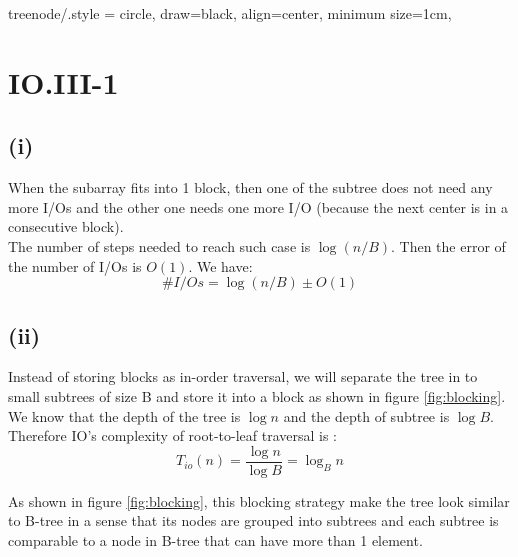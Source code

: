 
\tikzset
{
    treenode/.style = {circle, draw=black, align=center, minimum size=1cm},
}

\section*{IO.III-1}

\subsection*{(i)}
When the subarray fits into 1 block, then one of the subtree does not need any more I/Os and the other one needs one more I/O (because the next center is in a consecutive block).\\ 

The number of steps needed to reach such case is $\log(n/B)$. Then the error of the number of I/Os is $O(1)$. We have:
$$\#I/Os = \log(n/B) \pm O(1)$$

\subsection*{(ii)}
Instead of storing blocks as in-order traversal, we will separate the tree in to small subtrees of size B and store it into a block as shown in figure \ref{fig:blocking}.
We know that the depth of the tree is $\log n$ and the depth of subtree is $\log B$. Therefore IO's complexity of root-to-leaf traversal is :
$$T_{io}(n) = \frac{\log n}{\log B} = \log_{B} n$$

As shown in figure \ref{fig:blocking}, this blocking strategy make the tree look similar to B-tree in a sense that
its nodes are grouped into subtrees and each subtree is comparable to a node in B-tree that can have more than 1 element.


